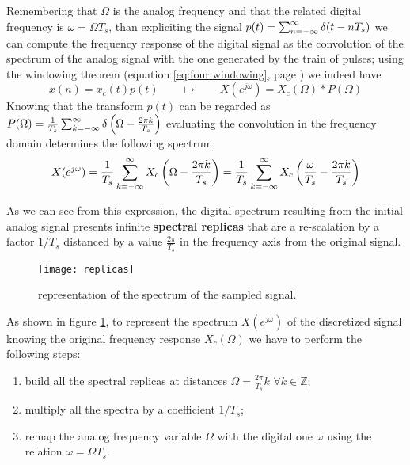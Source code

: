 			Remembering that $\Omega$ is the analog frequency and that the related digital frequency is $\omega = \Omega T_s$, than expliciting the signal $p(t) = \sum_{n=-\infty}^\infty \delta(t-nT_s)$ we can compute the frequency response of the digital signal as the convolution of the spectrum of the analog signal with the one generated by the train of pulses; using the windowing theorem (equation \ref{eq:four:windowing}, page \pageref{eq:four:windowing}) we indeed have
			\begin{equation}
				x(n) = x_c(t) p(t) \qquad \mapsto \qquad X(e^{j\omega}) = X_c(\Omega) * P(\Omega)
			\end{equation}
			Knowing that the transform $p(t)$ can be regarded as $P(\Omega) = \frac 1 {T_s} \sum_{k=-\infty}^\infty \delta \left( \Omega - \frac{2\pi k}{T_s} \right)$ evaluating the convolution in the frequency domain determines the following spectrum:
			\begin{equation}
				X(e^{j\omega}) = \frac 1 {T_s} \sum_{k=-\infty}^\infty X_c \left( \Omega - \frac{2\pi k}{T_s} \right) = \frac 1 {T_s} \sum_{k=-\infty}^\infty X_c \left( \frac \omega {T_s} - \frac{2\pi k}{T_s} \right)
			\end{equation}
		
			As we can see from this expression, the digital spectrum resulting from the initial analog signal presents infinite \textbf{spectral replicas} that are a re-scalation by a factor $1/T_s$ distanced by a value $\frac{2\pi}{T_s}$ in the frequency axis from the original signal.
			
			\begin{figure}[b!]
				\centering \texttt{[image: replicas]}
				\caption{representation of the spectrum of the sampled signal.} \label{fig:conv:replicas}
			\end{figure}
			
			As shown in figure \ref{fig:conv:replicas}, to represent the spectrum $X(e^{j\omega})$ of the discretized signal knowing the original frequency response $X_c(\Omega)$ we have to perform the following steps:
			\begin{enumerate}
				\item build all the spectral replicas at distances $\Omega = \frac{2\pi}{T_s} k$ $\forall k \in \mathds Z$;
				\item multiply all the spectra by a coefficient $1/T_s$;
				\item remap the analog frequency variable $\Omega$ with the digital one $\omega$ using the relation $\omega = \Omega T_s$.
			\end{enumerate}			
		
